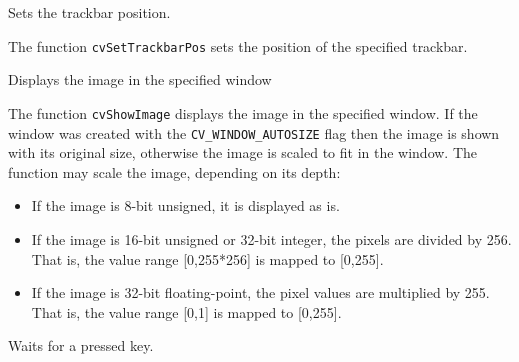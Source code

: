 Sets the trackbar position.


\begin{description}
\end{description}

The function \texttt{cvSetTrackbarPos} sets the position of the specified trackbar.

Displays the image in the specified window


\begin{description}
\end{description}

The function \texttt{cvShowImage} displays the image in the specified window. If the window was created with the \texttt{CV\_WINDOW\_AUTOSIZE} flag then the image is shown with its original size, otherwise the image is scaled to fit in the window. The function may scale the image, depending on its depth:
\begin{itemize}
    \item If the image is 8-bit unsigned, it is displayed as is.
    \item If the image is 16-bit unsigned or 32-bit integer, the pixels are divided by 256. That is, the value range [0,255*256] is mapped to [0,255].
    \item If the image is 32-bit floating-point, the pixel values are multiplied by 255. That is, the value range [0,1] is mapped to [0,255].
\end{itemize}

Waits for a pressed key.


\begin{description}
\end{description}

